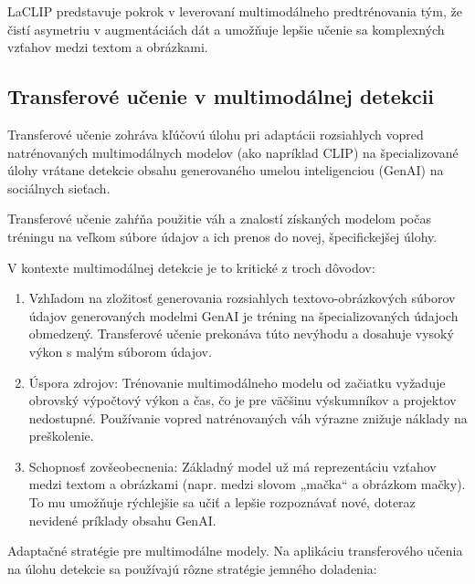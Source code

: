 \documentclass[]{tukediphc}
\begin{document}
LaCLIP predstavuje pokrok v leverovaní multimodálneho predtrénovania tým, že čistí asymetriu v augmentáciách dát a umožňuje lepšie učenie sa komplexných vzťahov medzi textom a obrázkami. 


\subsection{Transferové učenie v multimodálnej detekcii}
Transferové učenie zohráva kľúčovú úlohu pri adaptácii rozsiahlych vopred natrénovaných multimodálnych modelov (ako napríklad CLIP) na špecializované úlohy vrátane detekcie obsahu generovaného umelou inteligenciou (GenAI) na sociálnych sieťach. 

Transferové učenie zahŕňa použitie váh a znalostí získaných modelom počas tréningu na veľkom súbore údajov a ich prenos do novej, špecifickejšej úlohy. 

V kontexte multimodálnej detekcie je to kritické z troch dôvodov: 

\begin{enumerate}
    \item Vzhľadom na zložitosť generovania rozsiahlych textovo-obrázkových súborov údajov generovaných modelmi GenAI je tréning na špecializovaných údajoch obmedzený. Transferové učenie prekonáva túto nevýhodu a dosahuje vysoký výkon s malým súborom údajov. 
    \item Úspora zdrojov: Trénovanie multimodálneho modelu od začiatku vyžaduje obrovský výpočtový výkon a čas, čo je pre väčšinu výskumníkov a projektov nedostupné. Používanie vopred natrénovaných váh výrazne znižuje náklady na preškolenie. 
    \item Schopnosť zovšeobecnenia: Základný model už má reprezentáciu vzťahov medzi textom a obrázkami (napr. medzi slovom „mačka“ a obrázkom mačky). To mu umožňuje rýchlejšie sa učiť a lepšie rozpoznávať nové, doteraz nevidené príklady obsahu GenAI\cite{huggingface:transfer_learning}.
\end{enumerate}

Adaptačné stratégie pre multimodálne modely. Na aplikáciu transferového učenia na úlohu detekcie sa používajú rôzne stratégie jemného doladenia: 
\end{document}
